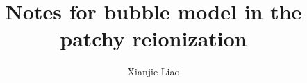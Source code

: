 \documentclass[aps,prd,twoside,onecolumn,floatfix,superscriptaddress,nofootinbib,showpacs]{revtex4-2}
\begin{document}
	\title{Notes for bubble model in the patchy reionization}
	
	\author{Xianjie Liao}
	\noaffiliation	
	\maketitle

    
    
    
		
\end{document}
